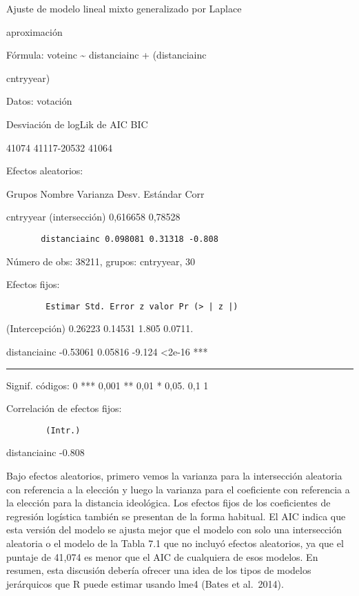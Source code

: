 \documentclass[
]{book}
\begin{document}
Ajuste de modelo lineal mixto generalizado por Laplace

aproximación

Fórmula: voteinc \textasciitilde{} distanciainc + (distanciainc \textbar{}

cntryyear)

Datos: votación

Desviación de logLik de AIC BIC

41074 41117-20532 41064

Efectos aleatorios:

Grupos Nombre Varianza Desv. Estándar Corr

cntryyear (intersección) 0,616658 0,78528

\begin{verbatim}
       distanciainc 0.098081 0.31318 -0.808
\end{verbatim}

Número de obs: 38211, grupos: cntryyear, 30

Efectos fijos:

\begin{verbatim}
        Estimar Std. Error z valor Pr (> | z |)
\end{verbatim}

(Intercepción) 0.26223 0.14531 1.805 0.0711.

distanciainc -0.53061 0.05816 -9.124 \textless2e-16 ***

\begin{center}\rule{0.5\linewidth}{0.5pt}\end{center}

Signif. códigos: 0 *** 0,001 ** 0,01 * 0,05. 0,1 1

Correlación de efectos fijos:

\begin{verbatim}
        (Intr.)
\end{verbatim}

distanciainc -0.808

Bajo efectos aleatorios, primero vemos la varianza para la intersección aleatoria con referencia a la elección y luego la varianza para el coeficiente con referencia a la elección para la distancia ideológica. Los efectos fijos de los coeficientes de regresión logística también se presentan de la forma habitual. El AIC indica que esta versión del modelo se ajusta mejor que el modelo con solo una intersección aleatoria o el modelo de la Tabla 7.1 que no incluyó efectos aleatorios, ya que el puntaje de 41,074 es menor que el AIC de cualquiera de esos modelos. En resumen, esta discusión debería ofrecer una idea de los tipos de modelos jerárquicos que R puede estimar usando lme4 (Bates et al.~2014).
\end{document}
